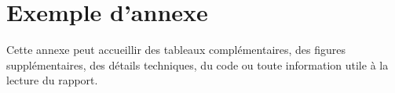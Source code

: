 \chapter{Exemple d'annexe}
Cette annexe peut accueillir des tableaux complémentaires, des figures supplémentaires, des détails techniques, du code ou toute information utile à la lecture du rapport.
